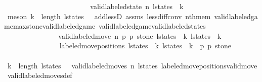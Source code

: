 \begin{isabellebody}
\ \ \ \ \ \ \ \ \ \ \isamarkupfalse%
{\isacharminus}\isanewline
\ \ \ \ \ \ \ \ \ \ \ \ \isamarkupfalse%
\ {\isachardoublequoteopen}valid{\isacharunderscore}labeled{\isacharunderscore}state\ n\ {\isacharparenleft}l{\isacharunderscore}states\ {\isacharbang}\ k{\isacharparenright}{\isachardoublequoteclose}\isanewline
\ \ \ \ \ \ \ \ \ \ \ \ \ \ \isamarkupfalse%
\ {\isacharparenleft}meson\ {\isacartoucheopen}k\ {\isacharless}\ length\ l{\isacharunderscore}states\ {\isacharminus}\ {}{\isacartoucheclose}\ add{\isacharunderscore}lessD{}\ assms\ less{\isacharunderscore}diff{\isacharunderscore}conv\ nth{\isacharunderscore}mem\ valid{\isacharunderscore}labeled{\isacharunderscore}game{\isacharunderscore}max{\isacharunderscore}stone{\isacharunderscore}valid{\isacharunderscore}labeled{\isacharunderscore}game\ valid{\isacharunderscore}labeled{\isacharunderscore}game{\isacharunderscore}valid{\isacharunderscore}labeled{\isacharunderscore}states{\isacharparenright}\isanewline
\ \ \ \ \ \ \ \ \ \ \ \ \isamarkupfalse%
\isanewline
\ \ \ \ \ \ \ \ \ \ \ \ \isamarkupfalse%
\ \isamarkupfalse%
\ {\isachardoublequoteopen}valid{\isacharunderscore}labeled{\isacharunderscore}move{\isacharprime}\ n\ p{}{\isacharprime}\ p{}{\isacharprime}\ stone\ {\isacharparenleft}l{\isacharunderscore}states\ {\isacharbang}\ k{\isacharparenright}\ {\isacharparenleft}l{\isacharunderscore}states\ {\isacharbang}\ {\isacharparenleft}k{\isacharplus}{}{\isacharparenright}{\isacharparenright}{\isachardoublequoteclose}\isanewline
\ \ \ \ \ \ \ \ \ \ \ \ \ \ \isamarkupfalse%
\ {\isacharbackquoteopen}labeled{\isacharunderscore}move{\isacharunderscore}positions\ {\isacharparenleft}l{\isacharunderscore}states\ {\isacharbang}\ k{\isacharparenright}\ {\isacharparenleft}l{\isacharunderscore}states\ {\isacharbang}\ {\isacharparenleft}k{\isacharplus}{}{\isacharparenright}{\isacharparenright}\ {\isacharequal}\ {\isacharparenleft}p{}{\isacharprime}{\isacharcomma}\ p{}{\isacharprime}{\isacharcomma}\ stone{\isacharparenright}{\isacharbackquoteclose}\isanewline
\ \ \ \ \ \ \ \ \ \ \ \ \ \ \isamarkupfalse%
\ {\isacartoucheopen}k\ {\isacharless}\ length\ l{\isacharunderscore}states\ {\isacharminus}\ {}{\isacartoucheclose}\ {\isacartoucheopen}valid{\isacharunderscore}labeled{\isacharunderscore}moves\ n\ l{\isacharunderscore}states{\isacartoucheclose}\ labeled{\isacharunderscore}move{\isacharunderscore}positions{\isacharunderscore}valid{\isacharunderscore}move{\isacharprime}\ valid{\isacharunderscore}labeled{\isacharunderscore}moves{\isacharunderscore}def\isanewline

\end{isabellebody}

